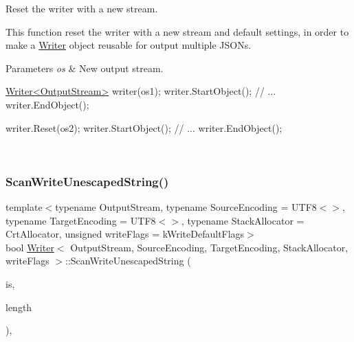 Reset the writer with a new stream. 

This function reset the writer with a new stream and default settings, in order to make a \hyperlink{classWriter}{Writer} object reusable for output multiple J\+S\+O\+Ns.


\begin{DoxyParams}{Parameters}
{\em os} & New output stream. 
\begin{DoxyCode}
\hyperlink{classWriter}{Writer<OutputStream>} writer(os1);
writer.StartObject();
\textcolor{comment}{// ...}
writer.EndObject();

writer.Reset(os2);
writer.StartObject();
\textcolor{comment}{// ...}
writer.EndObject();
\end{DoxyCode}
 \\
\hline
\end{DoxyParams}
\mbox{\label{classWriter_a94140803bba7863a1b39c936bbe6d262}} 
\subsubsection{\texorpdfstring{Scan\+Write\+Unescaped\+String()}{ScanWriteUnescapedString()}}
{\footnotesize\ttfamily template$<$typename Output\+Stream, typename Source\+Encoding = U\+T\+F8$<$$>$, typename Target\+Encoding = U\+T\+F8$<$$>$, typename Stack\+Allocator = Crt\+Allocator, unsigned write\+Flags = k\+Write\+Default\+Flags$>$ \\
bool \hyperlink{classWriter}{Writer}$<$ Output\+Stream, Source\+Encoding, Target\+Encoding, Stack\+Allocator, write\+Flags $>$\+::Scan\+Write\+Unescaped\+String (\begin{DoxyParamCaption}\item[{\hyperlink{structGenericStringStream}{Generic\+String\+Stream}$<$ Source\+Encoding $>$ \&}]{is,  }\item[{size\+\_\+t}]{length }\end{DoxyParamCaption})\hspace{0.3cm}{\ttfamily [inline]}, {\ttfamily [protected]}}

\mbox{\label{classWriter_a58e3f94dc5af1432a8eace5ba427eca7}} 
